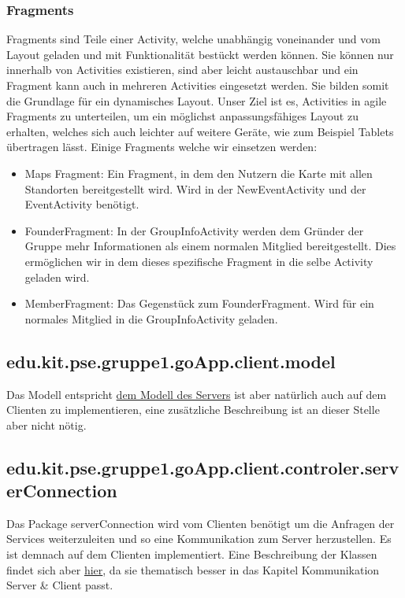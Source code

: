 	 \subsubsection{Fragments}
	 Fragments sind Teile einer Activity, welche unabhängig voneinander und vom Layout geladen und mit Funktionalität bestückt werden können.  
	 Sie können nur innerhalb von Activities existieren, sind aber leicht austauschbar und ein Fragment kann auch in mehreren Activities eingesetzt werden. 
	 Sie bilden somit die Grundlage für ein dynamisches Layout. \newline
	 Unser Ziel ist es, Activities in agile Fragments zu unterteilen, um ein möglichst anpassungsfähiges Layout zu erhalten, welches sich auch leichter auf weitere Geräte, wie zum Beispiel Tablets übertragen lässt.
	 \newline Einige Fragments welche wir einsetzen werden:
	 \begin{itemize}
	 \item Maps Fragment: Ein Fragment, in dem den Nutzern die Karte mit allen Standorten bereitgestellt wird. Wird in der NewEventActivity und der EventActivity benötigt.
	 \item FounderFragment: In der GroupInfoActivity werden dem Gründer der Gruppe mehr Informationen als einem normalen Mitglied bereitgestellt. Dies ermöglichen wir in dem dieses spezifische Fragment in die selbe Activity geladen wird.
	 \item MemberFragment: Das Gegenstück zum FounderFragment. Wird für ein normales Mitglied in die GroupInfoActivity geladen.
	 \end{itemize}
	 
	
	\subsection{edu.kit.pse.gruppe1.goApp.client.model}
	Das Modell entspricht \hyperlink{ServerModel}{dem Modell des Servers} ist aber natürlich auch auf dem Clienten zu implementieren, eine zusätzliche Beschreibung ist an dieser Stelle aber nicht nötig.
	
	\subsection{edu.kit.pse.gruppe1.goApp.client.controler.serverConnection}
	Das Package serverConnection wird vom Clienten benötigt um die Anfragen der Services weiterzuleiten und so eine Kommunikation zum Server herzustellen. Es ist demnach auf dem Clienten implementiert. Eine Beschreibung der Klassen findet sich aber \hyperlink{ServerConnection}{hier}, da sie thematisch besser in das Kapitel Kommunikation Server \& Client passt.